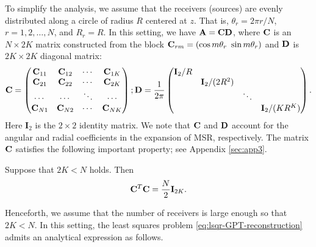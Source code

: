 To simplify the analysis, we assume that the receivers (sources)
are evenly distributed along a circle of radius $R$ centered at
$z$. That is, $\theta_r = 2\pi r/N$, $r = 1, 2, \ldots, N$, and
$R_r = R$. In this setting, we have $\mathbf{A} = \mathbf{C} \mathbf{D}$,
where $\mathbf{C}$ is an $N \times 2K$ matrix constructed from the
block $\mathbf{C}_{rm} = (\cos m \theta_r\ \sin m\theta_r)$ and
$\mathbf{D}$ is $2K \times 2K$ diagonal matrix:
\begin{equation}
\mathbf{C} = \begin{pmatrix}
\mathbf{C}_{11} & \mathbf{C}_{12} & \cdots & \mathbf{C}_{1K}\\
\mathbf{C}_{21} & \mathbf{C}_{22} & \cdots & \mathbf{C}_{2K}\\
\cdots & \cdots & \ddots & \cdots\\
\mathbf{C}_{N1} & \mathbf{C}_{N2} & \cdots & \mathbf{C}_{NK}
\end{pmatrix};
\mathbf{D} = \frac{1}{2\pi} \begin{pmatrix}
  \mathbf{I}_2/R&  &  &  \\
  &   \mathbf{I}_2/(2 R^2) &   &  \\
  &   & \ddots &  \\
  &   &   & \mathbf{I}_2/(K R^K)
\end{pmatrix}.
\label{defDC}
\end{equation}
Here $\mathbf{I}_2$ is the $2\times 2$ identity matrix. We note
that $\mathbf{C}$ and $\mathbf{D}$ account for the angular and radial
coefficients in the expansion of MSR, respectively. The matrix
$\mathbf{C}$ satisfies the following important property; see Appendix
\ref{sec:app3}.

\begin{proposition} Suppose that $2K < N$ holds. Then
\begin{equation}
\mathbf{C}^T \mathbf{C} = \frac{N}{2} \mathbf{I}_{2K}. \label{eq:ortho}
\end{equation}
\end{proposition}

Henceforth, we assume that the number of receivers is large enough
so that $2K < N$. In this setting, the least squares problem
\eqref{eq:lsqr-GPT-reconstruction} admits an analytical expression as follows.

